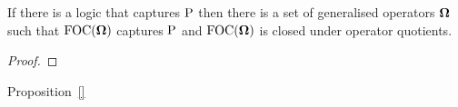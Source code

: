 \documentclass[../main/thesis.tex]{subfiles}
\begin{document}
\begin{prop}
  If there is a logic that captures $\mathrm{P}$ then there is a set of generalised
  operators $\mathbf{\mathbf{\Omega}}$ such that $\text{\upshape FOC}(\mathbf{\mathbf{\Omega}})$ captures $\mathrm{P}$ and $\text{\upshape FOC}(\mathbf{\mathbf{\Omega}})$
  is closed under operator quotients.
  \label{prop:P-uniform-quantifiers}
\end{prop}
\begin{proof}
 
\end{proof}

Proposition~\ref{}
\end{document}
